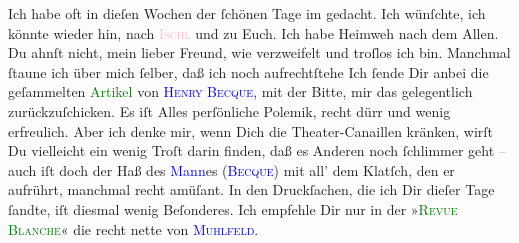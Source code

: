            \pstart
           Ich habe oft in dieſen Wochen der ſchönen Tage im \label{K_L02741-656v}\label{K_L02741-656h} gedacht. Ich wünſchte, ich könnte wieder hin, nach \textsc{\textcolor{pink}{Ischl}{}\ledrightnote{\textcolor{pink}{Bad Ischl}}}{ } und zu Euch. Ich habe Heimweh nach dem Allen. Du
               ahnſt nicht, mein lieber Freund, wie verzweifelt und troſlos ich bin. Manchmal ſtaune
               ich über mich ſelber, daß ich {\pb}noch aufrechtſtehe{\dotssix}\pend
           \pstart
           Ich ſende Dir anbei die geſammelten \textcolor{green}{Artikel}{} von \textsc{\textcolor{blue}{Henry Becque}{}\ledrightnote{\textcolor{blue}{Henry Becque}}}, mit der Bitte, mir das \label{K_L02741-88v}\label{K_L02741-88h} gelegentlich zurückzuſchicken. Es iſt Alles
               perſönliche Polemik, recht dürr und wenig erfreulich. Aber ich denke mir, wenn Dich
               die Theater-Canaillen kränken, wirſt Du vielleicht ein wenig Troſt darin finden, daß
               es Anderen noch ſchlimmer geht \textcolor{gray}{–} auch iſt doch der Haß des \textcolor{blue}{Mann}{}es (\textsc{\textcolor{blue}{Becque}{}\ledrightnote{\textcolor{blue}{Henry Becque}}}) mit all’ dem Klatſch, den er aufrührt, manchmal recht amüſant. In den
               Druckſachen, die ich Dir dieſer Tage {\pb}ſandte, iſt
               diesmal wenig Beſonderes. Ich empfehle Dir nur in der »\textsc{\textcolor{green}{Revue Blanche}{}\ledrightnote{\textcolor{green}{La Revue blanche}}}«  die recht nette \label{K_L02741-7v}\label{K_L02741-7h} von \textsc{\textcolor{blue}{Muhlfeld}{}\ledrightnote{\textcolor{blue}{Lucien Muhlfeld}}}.\pend
